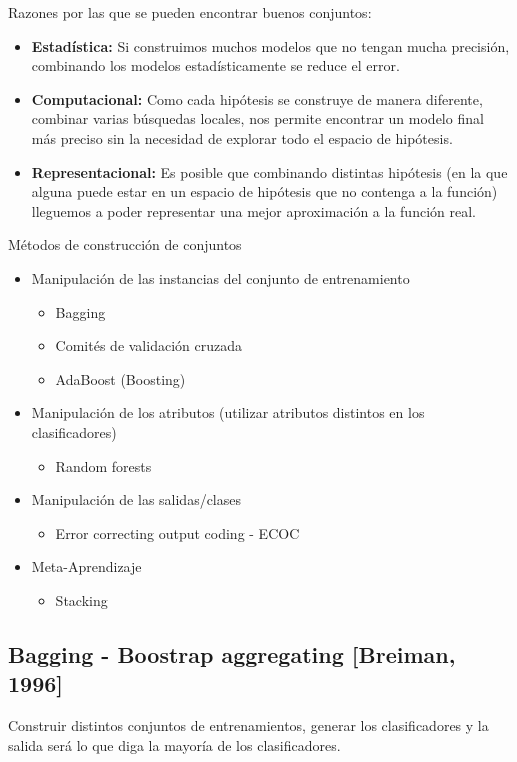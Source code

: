 \documentclass[12pt, twoside, openright]{report} %
\begin{document}
Razones por las que se pueden encontrar buenos conjuntos:
\begin{itemize}
	\item \textbf{Estadística:} Si construimos muchos modelos que no tengan mucha precisión, combinando los modelos estadísticamente se reduce el error.
	\item \textbf{Computacional:} Como cada hipótesis se construye de manera diferente, combinar varias búsquedas locales, nos permite encontrar un modelo final más preciso sin la necesidad de explorar todo el espacio de hipótesis.
	\item \textbf{Representacional:} Es posible que combinando distintas hipótesis (en la que alguna puede estar en un espacio de hipótesis que no contenga a la función) lleguemos a poder representar una mejor aproximación a la función real.
\end{itemize}

Métodos de construcción de conjuntos
\begin{itemize}
	\item Manipulación de las instancias del conjunto de entrenamiento
	      \begin{itemize}
		      \item Bagging
		      \item Comités de validación cruzada
		      \item AdaBoost (Boosting)
	      \end{itemize}
	\item Manipulación de los atributos (utilizar atributos distintos en los clasificadores)
	      \begin{itemize}
		      \item Random forests
	      \end{itemize}
	\item Manipulación de las salidas/clases
	      \begin{itemize}
		      \item Error correcting output coding - ECOC
	      \end{itemize}
	\item Meta-Aprendizaje
	      \begin{itemize}
		      \item Stacking
	      \end{itemize}
\end{itemize}

\subsection{Bagging - Boostrap aggregating [Breiman, 1996]}
Construir distintos conjuntos de entrenamientos, generar los clasificadores y la salida será lo que diga la mayoría de los clasificadores.
\end{document}

